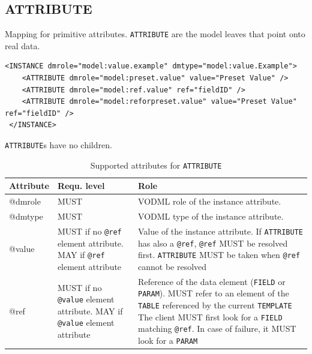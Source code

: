 \documentclass[11pt,a4paper]{ivoa}
\begin{document}
\subsection{ATTRIBUTE}

Mapping for primitive attributes. \texttt{ATTRIBUTE}  are the model leaves that point onto real data. 


\begin{lstlisting}[caption={ATTRIBUTE examples},captionpos=b]
<INSTANCE dmrole="model:value.example" dmtype="model:value.Example">
    <ATTRIBUTE dmrole="model:preset.value" value="Preset Value" />    
    <ATTRIBUTE dmrole="model:ref.value" ref="fieldID" />    
    <ATTRIBUTE dmrole="model:reforpreset.value" value="Preset Value" ref="fieldID" />
 </INSTANCE>
\end{lstlisting}

 \texttt{ATTRIBUTE}s have no children. 

\begin{table}[ht!]
     \begin{tabular}{|p{1.5cm}|p{4cm}|p{7cm}|}
       \hline Attribute & Requ. level & Role\\
       \hline  
      @dmrole   & MUST & VODML role of the instance attribute.\\       
       \hline 
      @dmtype   & MUST & VODML type of the instance attribute.\\
       \hline  
      @value  & MUST if no \texttt{@ref } element attribute. \newline MAY if \texttt{@ref} element attribute 
                    & Value of the instance attribute. 
                     \newline If  \texttt{ATTRIBUTE} has also a \texttt{@ref}, \texttt{@ref} MUST be resolved first.
                     \texttt{ATTRIBUTE}  MUST be taken when \texttt{@ref} cannot be resolved \\
        \hline
       @ref  & MUST if no \texttt{@value} element attribute. 
                     \newline MAY if \texttt{@value} element attribute 
                & Reference of the data element (\texttt{FIELD} or \texttt{PARAM}).  
                    \newline MUST refer to an element of the \texttt{TABLE}  referenced by the current     
                    \texttt{TEMPLATE}                    
                    \newline The client MUST first look for a \texttt{FIELD} matching \texttt{@ref}. 
                    \newline In case of failure, it MUST look for a \texttt{PARAM}
                    \\
       \hline 
     \end{tabular}
     \caption{Supported attributes for  \texttt{ATTRIBUTE}} 
 \end{table}
\end{document}
